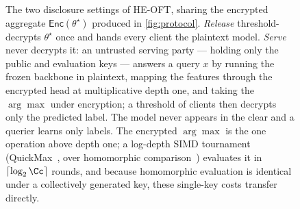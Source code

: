 \begin{figure}[t]
{%
}
\caption{The two disclosure settings of HE-OFT, sharing the encrypted aggregate $\mathsf{Enc}(\theta^\star)$
produced in \cref{fig:protocol}. \emph{Release} threshold-decrypts $\theta^\star$ once and hands every client
the plaintext model. \emph{Serve} never decrypts it: an untrusted serving party --- holding only the public
and evaluation keys --- answers a query $x$ by running the frozen backbone in plaintext, mapping the features
through the encrypted head at multiplicative depth one, and taking the $\arg\max$ under encryption; a threshold
of clients then decrypts only the predicted label. The model never appears in the clear and a querier learns
only labels. The encrypted $\arg\max$ is the one operation above depth one; a log-depth SIMD tournament
(QuickMax~\cite{zhang2025nexus}, over homomorphic comparison~\cite{cheon2020comparison}) evaluates it in
$\lceil\log_2\Cc\rceil$ rounds, and because homomorphic evaluation is identical under a collectively generated
key, these single-key costs transfer directly.}
\label{fig:serve}
\end{figure}
